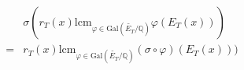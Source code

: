 \documentclass[preview]{standalone}
\begin{document}
\begin{center}
\begin{align*} &\sigma(r_T(x) \text{lcm}_{\varphi \in \text{Gal}\left(\widetilde{E_T}/\mathbb{Q}\right)} \varphi(E_T(x))) \\ = & r_T(x)\text{lcm}_{\varphi \in \text{Gal}\left(\widetilde{E_T}/\mathbb{Q}\right)} (\sigma \circ \varphi)(E_T(x)))  \end{align*}
\end{center}
\end{document}
